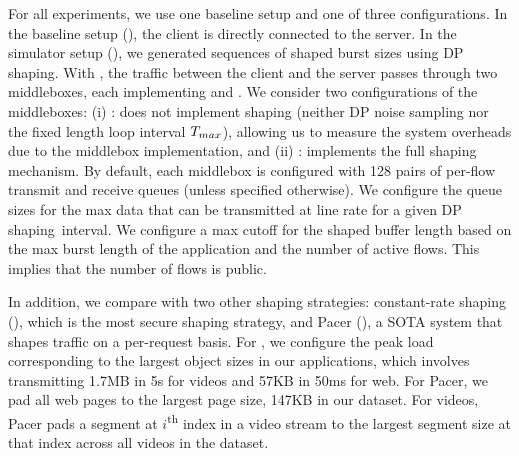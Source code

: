 For all experiments, we use one baseline setup and one of three {\sys}
configurations.
In the baseline setup ({\base}), the client is directly connected to the server.
In the simulator setup ({\nssim}), we generated sequences of shaped burst sizes
using DP shaping.
With {\sys}, the traffic between the client and the server passes through two
middleboxes, each implementing {\ushaper} and {\dshaper}.
We consider two configurations of the middleboxes:
(i) {\nsnoshape}: {\dshaper} does not implement shaping (\ie neither DP noise
sampling nor the fixed length loop interval $T_{max}$), allowing us to
measure the system overheads due to the middlebox implementation, and
(ii) {\ns}: {\dshaper} implements the full shaping mechanism.
{By default, each middlebox is configured with 128 pairs of per-flow
transmit and receive queues (unless specified otherwise). We configure the queue
sizes for the max data that can be transmitted at line rate for a given
DP shaping~interval. We configure a max cutoff for the shaped buffer length
based on the max burst length of the application and the number of active
flows. This implies that the number of flows is public.}

In addition, we compare with two other shaping strategies: constant-rate shaping
({\constshape}), which is the most secure shaping strategy, and Pacer
({\pacer}), a SOTA system that shapes traffic on a per-request basis.
For {\constshape}, we configure the peak load corresponding to the largest
object sizes in our applications, which involves transmitting 1.7MB in 5s for
videos and 57KB in 50ms for web.
For Pacer, we pad all web pages to the largest page size, \ie 147KB in our
dataset. For videos, Pacer pads a segment at $i$\textsuperscript{th} index
in a video stream to the largest segment size at that index across all videos in
the dataset.


